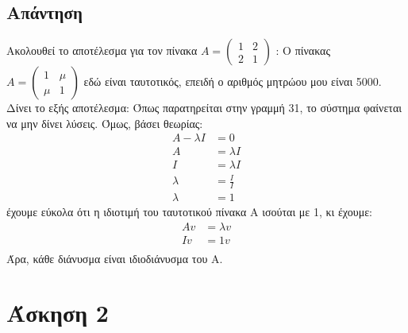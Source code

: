 \documentclass[a4paper,12pt]{article}
\begin{document}
\subsection{Απάντηση}
Ακολουθεί το αποτέλεσμα για τον πίνακα
$
	A=\begin{pmatrix}
		1 & 2 \\
		2 & 1
	\end{pmatrix}
$
:
Ο πίνακας
$
	A=\begin{pmatrix}
		1   & \mu \\
		\mu & 1
	\end{pmatrix}
$
εδώ είναι ταυτοτικός, επειδή ο αριθμός μητρώου μου είναι 5000. Δίνει το εξής αποτέλεσμα:
Όπως παρατηρείται στην γραμμή 31, το σύστημα φαίνεται να μην δίνει λύσεις. Όμως, βάσει θεωρίας:
\begin{equation}
	\begin{split}
		A - \lambda I &= 0 \\
		A &= \lambda I \\
		I &= \lambda I \\
		\lambda & =\frac{I}{I} \\
		\lambda & =1
	\end{split}
\end{equation}
έχουμε εύκολα ότι η ιδιοτιμή του ταυτοτικού  πίνακα Α ισούται με 1, κι έχουμε:
\begin{equation}
	\begin{split}
		A v &= \lambda v \\
		I v&= 1 v \\
	\end{split}
\end{equation}
Άρα, κάθε διάνυσμα είναι ιδιοδιάνυσμα του Α.
\newpage\section{Άσκηση 2}
\end{document}
